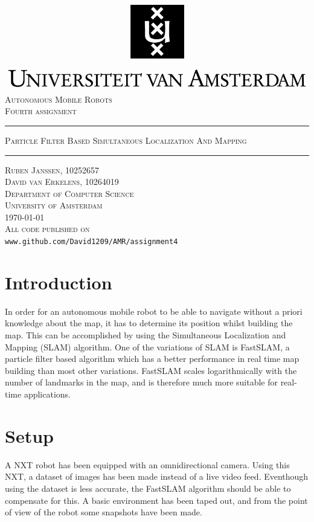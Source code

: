 \documentclass[12pt]{article}
\begin{document}
\begin{titlepage}
\begin{center}
    \includegraphics[width=\textwidth]{./logo.png}
    \\ [2.5cm]
    \textsc{\Large Autonomous Mobile Robots}
    \\ [0.5cm]
    \textsc{\large Fourth assignment}
    \\ [1cm]
    \hrule
    \vspace{0.3cm}
    \textsc{Particle Filter Based Simultaneous Localization And Mapping}
    \\ [0.3cm]
    \hrule
    \vfill
    \textsc{Ruben Janssen, 10252657 \\ David van Erkelens, 10264019 \\[0.7cm] Department of Computer Science \\ University of Amsterdam \\[0.3cm] \today \\[0.5cm] All code published on}
    \\
    \verb|www.github.com/David1209/AMR/assignment4|
\end{center}
\end{titlepage}
\tableofcontents
\clearpage
\section{Introduction}
In order for an autonomous mobile robot to be able to navigate without a priori knowledge about the map, it has to determine its position whilst building the map. This can be accomplished by using the Simultaneous Localization and Mapping (SLAM) algorithm. One of the variations of SLAM is FastSLAM, a particle filter based algorithm which has a better performance in real time map building than most other variations. FastSLAM scales logarithmically with the number of landmarks in the map, and is therefore much more suitable for real-time applications.

\section{Setup}
A NXT robot has been equipped with an omnidirectional camera. Using this NXT, a dataset of images has been made instead of a live video feed. Eventhough using the dataset is less accurate, the FastSLAM algorithm should be able to compensate for this. A basic environment has been taped out, and from the point of view of the robot some snapshots have been made. 
\end{document}
